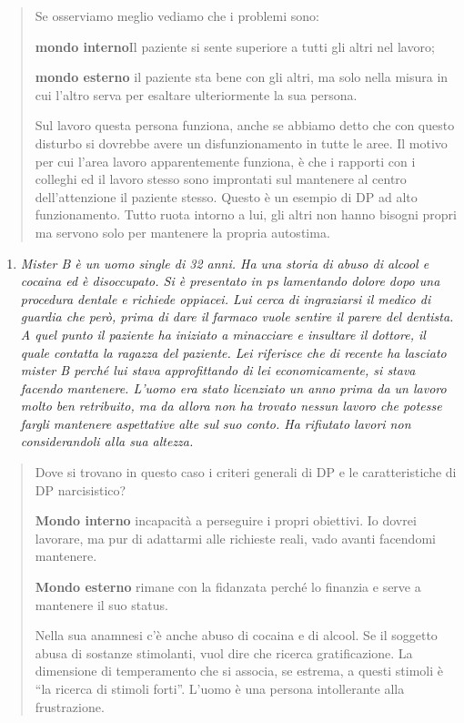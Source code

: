 \documentclass[]{article}
\begin{document}
\begin{quote}
Se osserviamo meglio vediamo che i problemi sono:

\textbf{mondo interno}Il paziente si sente superiore a tutti gli altri
nel lavoro;

\textbf{mondo esterno} il paziente sta bene con gli altri, ma solo nella
misura in cui l'altro serva per esaltare ulteriormente la sua persona.

Sul lavoro questa persona funziona, anche se abbiamo detto che con
questo disturbo si dovrebbe avere un disfunzionamento in tutte le aree.
Il motivo per cui l'area lavoro apparentemente funziona, è che i
rapporti con i colleghi ed il lavoro stesso sono improntati sul
mantenere al centro dell'attenzione il paziente stesso. Questo è un
esempio di DP ad alto funzionamento. Tutto ruota intorno a lui, gli
altri non hanno bisogni propri ma servono solo per mantenere la propria
autostima.
\end{quote}

\begin{enumerate}
\def\labelenumi{\arabic{enumi}.}
\item
  \emph{Mister B è un uomo single di 32 anni. Ha una storia di abuso di
  alcool e cocaina ed è disoccupato. Si è presentato in ps lamentando
  dolore dopo una procedura dentale e richiede oppiacei. Lui cerca di
  ingraziarsi il medico di guardia che però, prima di dare il farmaco
  vuole sentire il parere del dentista. A quel punto il paziente ha
  iniziato a minacciare e insultare il dottore, il quale contatta la
  ragazza del paziente. Lei riferisce che di recente ha lasciato mister
  B perché lui stava approfittando di lei economicamente, si stava
  facendo mantenere. L'uomo era stato licenziato un anno prima da un
  lavoro molto ben retribuito, ma da allora non ha trovato nessun lavoro
  che potesse fargli mantenere aspettative alte sul suo conto. Ha
  rifiutato lavori non considerandoli alla sua altezza.}
\end{enumerate}

\begin{quote}
Dove si trovano in questo caso i criteri generali di DP e le
caratteristiche di DP narcisistico?

\textbf{Mondo interno} incapacità a perseguire i propri obiettivi. Io
dovrei lavorare, ma pur di adattarmi alle richieste reali, vado avanti
facendomi mantenere.

\textbf{Mondo esterno} rimane con la fidanzata perché lo finanzia e
serve a mantenere il suo status.

Nella sua anamnesi c'è anche abuso di cocaina e di alcool. Se il
soggetto abusa di sostanze stimolanti, vuol dire che ricerca
gratificazione. La dimensione di temperamento che si associa, se
estrema, a questi stimoli è ``la ricerca di stimoli forti''. L'uomo è
una persona intollerante alla frustrazione.
\end{quote}
\end{document}

